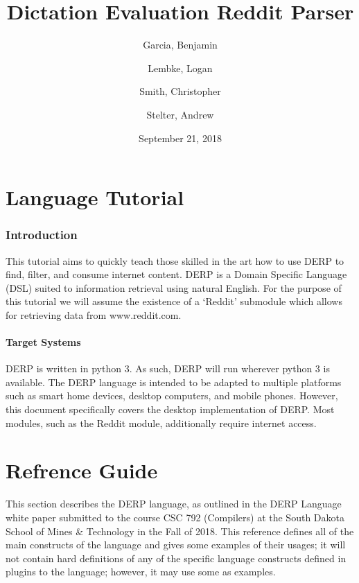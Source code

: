 \documentclass{article}
\title{\textbf{Dictation Evaluation Reddit Parser}}
\author{
Garcia, Benjamin \and
Lembke, Logan \and
Smith, Christopher \and
Stelter, Andrew
}
\date{September 21, 2018}
\begin{document}
\maketitle %

\newpage
\tableofcontents




\newpage


\part{Language Tutorial}
\section{Introduction}
This tutorial aims to quickly teach those skilled in the art how to use DERP to find, filter, and consume internet content. DERP is a Domain Specific Language (DSL) suited to information retrieval using natural English. For the purpose of this tutorial we will assume the existence of a ‘Reddit’ submodule which allows for retrieving data from www.reddit.com.

\subsection{Target Systems}
DERP is written in python 3. As such, DERP will run wherever python 3 is available. The DERP language is intended to be adapted to multiple platforms such as smart home devices, desktop computers, and mobile phones. However, this document specifically covers the desktop implementation of DERP. Most modules, such as the Reddit module, additionally require internet access.





\part{Refrence Guide}
This section describes the DERP language, as outlined in the DERP Language white paper submitted
to the course CSC 792 (Compilers) at the South Dakota School of Mines \& Technology in the Fall
of 2018. This reference defines all of the main constructs of the language and gives some examples
of their usages; it will not contain hard definitions of any of the specific language constructs
defined in plugins to the language; however, it may use some as examples.






\end{document}
